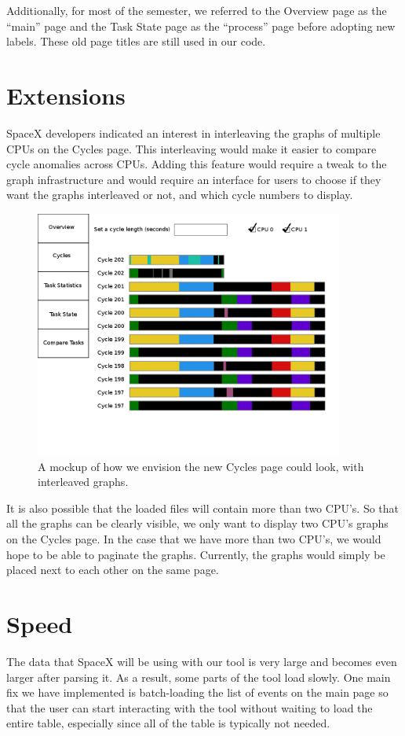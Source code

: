 \documentclass{hmcclinic}
\begin{document}
  Additionally, for most of the semester, we referred to the Overview page as
  the ``main'' page and the Task State page as the ``process'' page before
  adopting new labels. These old page titles are still used in our code.

\section{Extensions}
  SpaceX developers indicated an interest in interleaving the graphs of multiple
  CPUs on the Cycles page.  This interleaving would make it easier to compare
  cycle anomalies across CPUs. Adding this feature would require a tweak to the
  graph infrastructure and would require an interface for users to choose if they
  want the graphs interleaved or not, and which cycle numbers to display.

  \begin{figure}[H]
\begin{center}
\includegraphics[width=4in]{futureCycles.png}
\caption{A mockup of how we envision the new Cycles page could look, with
interleaved graphs.}
\end{center}
\end{figure}

It is also possible that the loaded files will contain more than two CPU's.
So that all the graphs can be clearly visible, we only want to display two CPU's graphs
on the Cycles page. In the case that we have more than two CPU's, 
we would hope to be able to paginate the graphs. Currently, the graphs
would simply be placed next to each other on the same page.

\section{Speed} %
The data that SpaceX will be using with our tool is very large and becomes even
larger after parsing it. As a result, some parts of the tool load slowly. One main fix we have
implemented is batch-loading the list of events on the main page so that the
user can start interacting with the tool without waiting to load the entire
table, especially since all of the table is typically not needed.
\end{document}

